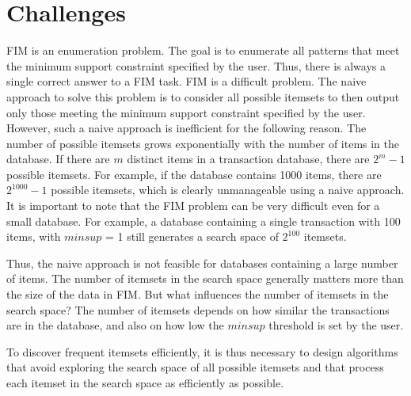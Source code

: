 \section{Challenges}
FIM is an enumeration problem. The goal is to enumerate all patterns that meet the
minimum support constraint specified by the user. Thus, there is always a single correct
answer to a FIM task. FIM is a difficult problem. The naive approach to solve this problem
is to consider all possible itemsets to then output only those meeting the minimum support
constraint specified by the user. However, such a naive approach is inefficient for the following
reason. The number of possible itemsets grows exponentially with the number of items in the
database.
If there are $m$ distinct items in a transaction database, there are $2^m - 1$ possible itemsets.
For example, if the database contains 1000 items, there are $2^{1000} - 1$ possible itemsets,
which is clearly unmanageable using a naive approach. It is important
to note that the FIM problem can be very difficult even for a small database. For example,
a database containing a single transaction with 100 items, with $minsup$ = 1 still generates
a search space of $2^{100}$ itemsets.

Thus, the naive approach is not feasible for databases containing a large number of items.
The number of itemsets in the search space generally matters more than the size of the data in FIM. But what influences the number of itemsets
in the search space? The number of itemsets depends on how similar the transactions are in
the database, and also on how low the $minsup$ threshold is set by the user.

To discover frequent itemsets efficiently, it is thus necessary to design algorithms that
avoid exploring the search space of all possible itemsets and that process each itemset in the
search space as efficiently as possible.